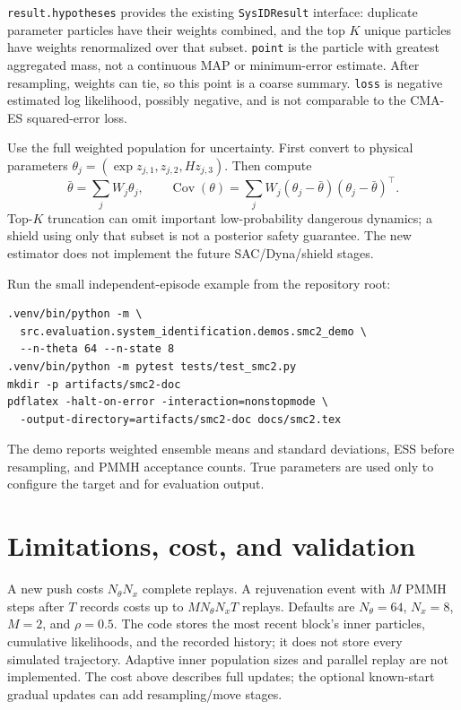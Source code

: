 \documentclass[11pt]{article}
\begin{document}
\texttt{result.hypotheses} provides the existing \texttt{SysIDResult}
interface: duplicate parameter particles have their weights combined,
and the top $K$ unique particles have weights renormalized over that
subset. \texttt{point} is the particle with greatest aggregated mass,
not a continuous MAP or minimum-error estimate. After resampling,
weights can tie, so this point is a coarse summary.
\texttt{loss} is negative estimated log likelihood, possibly negative,
and is not comparable to the CMA-ES squared-error loss.

Use the full weighted population for uncertainty. First convert to physical
parameters $\theta_j=(\exp z_{j,1},z_{j,2},Hz_{j,3})$. Then compute
\begin{equation}
 \bar\theta=\sum_j W_j\theta_j,\qquad
 \operatorname{Cov}(\theta)=\sum_jW_j
 (\theta_j-\bar\theta)(\theta_j-\bar\theta)^\top.
\end{equation}
Top-$K$ truncation can omit important low-probability dangerous dynamics;
a shield using only that subset is not a posterior safety guarantee.
The new estimator does not implement the future SAC/Dyna/shield stages.

Run the small independent-episode example from the repository root:
\begin{verbatim}
.venv/bin/python -m \
  src.evaluation.system_identification.demos.smc2_demo \
  --n-theta 64 --n-state 8
.venv/bin/python -m pytest tests/test_smc2.py
mkdir -p artifacts/smc2-doc
pdflatex -halt-on-error -interaction=nonstopmode \
  -output-directory=artifacts/smc2-doc docs/smc2.tex
\end{verbatim}
The demo reports weighted ensemble means and standard deviations, ESS
before resampling, and PMMH acceptance counts. True parameters are used
only to configure the target and for evaluation output.

\section{Limitations, cost, and validation}
A new push costs $N_\theta N_x$ complete replays. A rejuvenation event
with $M$ PMMH steps after $T$ records costs up to
$M N_\theta N_x T$ replays. Defaults are $N_\theta=64$, $N_x=8$,
$M=2$, and $\rho=0.5$. The code stores the most recent block's inner
particles, cumulative likelihoods, and the recorded history; it does
not store every simulated trajectory. Adaptive inner population sizes and
parallel replay are not implemented. The cost above describes full updates;
the optional known-start gradual updates can add resampling/move stages.
\end{document}
